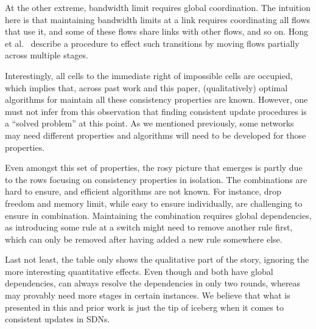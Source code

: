 At the other extreme, bandwidth limit requires global coordination. The intuition here is that maintaining bandwidth limits at a link requires coordinating all flows that use it, and some of these flows share links with other flows, and so on. Hong et al.~\cite{swan} describe a procedure to effect such transitions by moving flows partially across multiple stages.

Interestingly, all cells to the immediate right of impossible cells are occupied, which implies that, across past work and this paper,  (qualitatively) optimal algorithms for maintain all these consistency properties are known. However, one must not infer from this observation that finding consistent update procedures is a ``solved problem'' at this point.  As we mentioned previously, some networks may need different properties and algorithms will need to be developed for those properties.

Even amongst this set of properties, the rosy picture that emerges is partly due to the rows focusing on consistency properties in isolation. The combinations are hard to  ensure, and efficient algorithms are not known. For instance, drop freedom and memory limit, while easy to ensure individually, are challenging to ensure in combination. Maintaining the combination requires global dependencies, as introducing some rule at a switch might need to remove another rule first, which can only be removed after having added a new rule somewhere else.

Last not least, the table only shows the qualitative part of the story, ignoring the more interesting quantitative effects. Even though \cite{safeupdate} and \cite{swan} both have global dependencies, \cite{safeupdate} can always resolve the dependencies in only two rounds, whereas \cite{swan} may provably need more stages in certain instances. We believe that what is presented in this and prior work is just the tip of iceberg when it comes to consistent updates in SDNs.
